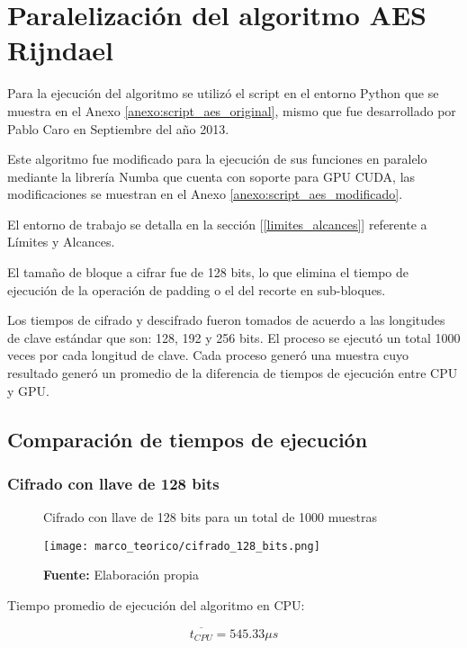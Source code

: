 \documentclass[../main/main.tex]{subfiles}
\begin{document}
  \section{Paralelización del algoritmo AES Rijndael}

    Para la ejecución del algoritmo se utilizó el script en el entorno Python que se muestra en el Anexo \ref{anexo:script_aes_original}, mismo que fue desarrollado por Pablo Caro en Septiembre del año 2013.

    Este algoritmo fue modificado para la ejecución de sus funciones en paralelo mediante la librería Numba que cuenta con soporte para GPU CUDA, las modificaciones se muestran en el Anexo \ref{anexo:script_aes_modificado}.

    El entorno de trabajo se detalla en la sección [\ref{limites_alcances}] referente a Límites y Alcances.

    El tamaño de bloque a cifrar fue de 128 bits, lo que elimina el tiempo de ejecución de la operación de padding o el del recorte en sub-bloques.

    Los tiempos de cifrado y descifrado fueron tomados de acuerdo a las longitudes de clave estándar que son: 128, 192 y 256 bits. El proceso se ejecutó un total 1000 veces por cada longitud de clave. Cada proceso generó una muestra cuyo resultado generó un promedio de la diferencia de tiempos de ejecución entre CPU y GPU.

    \subsection{Comparación de tiempos de ejecución}

      \subsubsection{Cifrado con llave de 128 bits}

        \begin{figure}[H]
          \centering
          \caption{Cifrado con llave de 128 bits para un total de 1000 muestras}
          \texttt{[image: marco\_teorico/cifrado\_128\_bits.png]}
          \caption*{\textbf{Fuente:} Elaboración propia}
        \end{figure}

        Tiempo promedio de ejecución del algoritmo en CPU:

        \vspace{-0.7cm}\begin{equation}
          \overline{t_{CPU}} = 545.33\mu s
        \end{equation}
\end{document}
